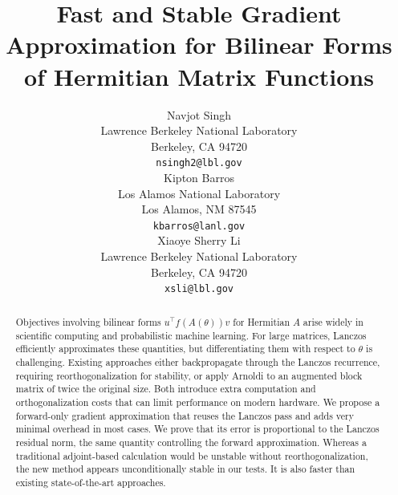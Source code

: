 \documentclass{article}
\title{Fast and Stable Gradient Approximation for Bilinear Forms of Hermitian Matrix Functions}
\author{%
  Navjot Singh \\
  Lawrence Berkeley National Laboratory\\
  Berkeley, CA 94720 \\
  \texttt{nsingh2@lbl.gov} \\
  \And
  Kipton Barros \\
  Los Alamos National Laboratory \\
  Los Alamos, NM 87545 \\
  \texttt{kbarros@lanl.gov} \\
  \And
  Xiaoye Sherry Li\\
  Lawrence Berkeley National Laboratory\\
  Berkeley, CA 94720 \\
  \texttt{xsli@lbl.gov} 
}
\begin{document}
\maketitle

\begin{abstract}
Objectives involving bilinear forms \(u^\top f(A(\theta))v\) for Hermitian \(A\) arise widely in scientific computing and probabilistic machine learning. For large matrices, Lanczos efficiently approximates these quantities, but differentiating them with respect to \(\theta\) is challenging. Existing approaches either backpropagate through the Lanczos recurrence, requiring reorthogonalization for stability, or apply Arnoldi to an augmented block matrix of twice the original size. Both introduce extra computation and orthogonalization costs that can limit performance on modern hardware.
We propose a forward-only gradient approximation that reuses the Lanczos pass and adds 
very minimal overhead in most cases.
We prove that its error is proportional to the Lanczos residual norm, the same quantity controlling the forward approximation. 
Whereas a traditional adjoint-based calculation would be unstable without reorthogonalization, the new method appears unconditionally stable in our tests. It is also faster than existing state-of-the-art approaches.
\end{abstract}
\end{document}
